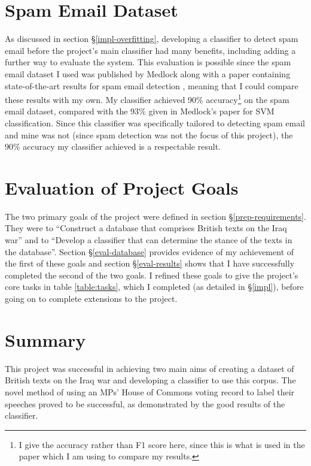 \documentclass[12pt,a4paper,twoside,openright]{report}
\begin{document}
\section{Spam Email Dataset} \label{eval-spam}

As discussed in section \S\ref{impl-overfitting}, developing a classifier to detect spam email before the project's main classifier had many benefits, including adding a further way to evaluate the system. This evaluation is possible since the spam email dataset I used was published by Medlock along with a paper containing state-of-the-art results for spam email detection \cite{spampaper}, meaning that I could compare these results with my own. My classifier achieved 90\% accuracy\footnote{I give the accuracy rather than F1 score here, since this is what is used in the paper which I am using to compare my results.} on the spam email dataset, compared with the 93\% given in Medlock's paper for SVM classification. Since this classifier was specifically tailored to detecting spam email and mine was not (since spam detection was not the focus of this project), the 90\% accuracy my classifier achieved is a respectable result.

\section{Evaluation of Project Goals} \label{eval-goals}

The two primary goals of the project were defined in section \S\ref{prep-requirements}. They were to ``Construct a database that comprises British texts on the Iraq war'' and to ``Develop a classifier that can determine the stance of the texts in the database''. Section \S\ref{eval-database} provides evidence of my achievement of the first of these goals and section \S\ref{eval-results} shows that I have successfully completed the second of the two goals. I refined these goals to give the project's core tasks in table \ref{table:tasks}, which I completed (as detailed in \S\ref{impl}), before going on to complete extensions to the project.

\section{Summary}

This project was successful in achieving two main aims of creating a dataset of British texts on the Iraq war and developing a classifier to use this corpus. The novel method of using an MPs' House of Commons voting record to label their speeches proved to be successful, as demonstrated by the good results of the classifier.
\end{document}
